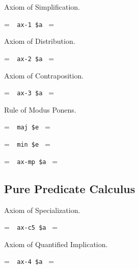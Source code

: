 Axiom of Simplification.\label{ax1}

\setbox\startprefix=\hbox{\tt \ \ ax-1\ \$a\ }
\setbox\contprefix=\hbox{\tt \ \ \ \ \ \ \ \ \ \ }
\startm
\m{\vdash}\m{(}\m{\varphi}\m{\rightarrow}\m{(}\m{\psi}\m{\rightarrow}\m{\varphi}\m{)}
\m{)}
\endm

\noindent Axiom of Distribution.

\setbox\startprefix=\hbox{\tt \ \ ax-2\ \$a\ }
\setbox\contprefix=\hbox{\tt \ \ \ \ \ \ \ \ \ \ }
\startm
\m{\vdash}\m{(}\m{(}\m{\varphi}\m{\rightarrow}\m{(}\m{\psi}\m{\rightarrow}\m{\chi}
\m{)}\m{)}\m{\rightarrow}\m{(}\m{(}\m{\varphi}\m{\rightarrow}\m{\psi}\m{)}\m{
\rightarrow}\m{(}\m{\varphi}\m{\rightarrow}\m{\chi}\m{)}\m{)}\m{)}
\endm

\noindent Axiom of Contraposition.

\setbox\startprefix=\hbox{\tt \ \ ax-3\ \$a\ }
\setbox\contprefix=\hbox{\tt \ \ \ \ \ \ \ \ \ \ }
\startm
\m{\vdash}\m{(}\m{(}\m{\lnot}\m{\varphi}\m{\rightarrow}\m{\lnot}\m{\psi}\m{)}\m{
\rightarrow}\m{(}\m{\psi}\m{\rightarrow}\m{\varphi}\m{)}\m{)}
\endm


\noindent Rule of Modus Ponens.

\setbox\startprefix=\hbox{\tt \ \ maj\ \$e\ }
\setbox\contprefix=\hbox{\tt \ \ \ \ \ \ \ \ \ }
\startm
\m{\vdash}\m{(}\m{\varphi}\m{\rightarrow}\m{\psi}\m{)}
\endm

\setbox\startprefix=\hbox{\tt \ \ min\ \$e\ }
\setbox\contprefix=\hbox{\tt \ \ \ \ \ \ \ \ \ }
\startm
\m{\vdash}\m{\varphi}
\endm

\setbox\startprefix=\hbox{\tt \ \ ax-mp\ \$a\ }
\setbox\contprefix=\hbox{\tt \ \ \ \ \ \ \ \ \ \ \ }
\startm
\m{\vdash}\m{\psi}
\endm


\subsection{Pure Predicate Calculus}

\noindent Axiom of Specialization.

\setbox\startprefix=\hbox{\tt \ \ ax-c5\ \$a\ }
\setbox\contprefix=\hbox{\tt \ \ \ \ \ \ \ \ \ \ }
\startm
\m{\vdash}\m{(}\m{\forall}\m{\varphi}\m{\rightarrow}\m{\varphi}\m{)}
\endm

\noindent Axiom of Quantified Implication.

\setbox\startprefix=\hbox{\tt \ \ ax-4\ \$a\ }
\setbox\contprefix=\hbox{\tt \ \ \ \ \ \ \ \ \ \ }
\startm
\m{\vdash}\m{(}\m{\forall}\m{(}\m{\forall}\m{\varphi}\m{\rightarrow}\m{
\psi}\m{)}\m{\rightarrow}\m{(}\m{\forall}\m{\varphi}\m{\rightarrow}\m{
\forall}\m{\psi}\m{)}\m{)}
\endm

